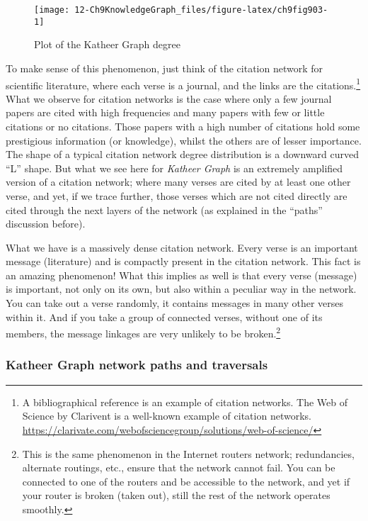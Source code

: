 \documentclass[
]{article}
\begin{document}
\begin{figure}

{\centering \texttt{[image: 12-Ch9KnowledgeGraph\_files/figure-latex/ch9fig903-1]} 

}

\caption{Plot of the Katheer Graph degree}\label{fig:ch9fig903}
\end{figure}

To make sense of this phenomenon, just think of the citation network for scientific literature, where each verse is a journal, and the links are the citations.\footnote{A bibliographical reference is an example of citation networks. The Web of Science by Clarivent is a well-known example of citation networks. \url{https://clarivate.com/webofsciencegroup/solutions/web-of-science/}} What we observe for citation networks is the case where only a few journal papers are cited with high frequencies and many papers with few or little citations or no citations. Those papers with a high number of citations hold some prestigious information (or knowledge), whilst the others are of lesser importance. The shape of a typical citation network degree distribution is a downward curved ``L'' shape. But what we see here for \emph{Katheer Graph} is an extremely amplified version of a citation network; where many verses are cited by at least one other verse, and yet, if we trace further, those verses which are not cited directly are cited through the next layers of the network (as explained in the ``paths'' discussion before).

What we have is a massively dense citation network. Every verse is an important message (literature) and is compactly present in the citation network. This fact is an amazing phenomenon! What this implies as well is that every verse (message) is important, not only on its own, but also within a peculiar way in the network. You can take out a verse randomly, it contains messages in many other verses within it. And if you take a group of connected verses, without one of its members, the message linkages are very unlikely to be broken.\footnote{This is the same phenomenon in the Internet routers network; redundancies, alternate routings, etc., ensure that the network cannot fail. You can be connected to one of the routers and be accessible to the network, and yet if your router is broken (taken out), still the rest of the network operates smoothly.}

\hypertarget{katheer-graph-network-paths-and-traversals}{%
\subsubsection{Katheer Graph network paths and traversals}\label{katheer-graph-network-paths-and-traversals}}
\end{document}
